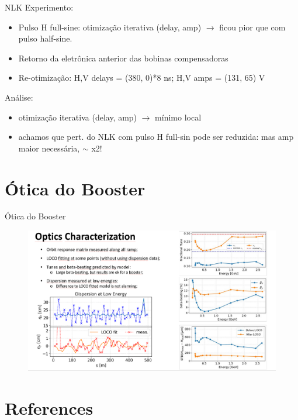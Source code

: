 \documentclass{beamer}					  %
\begin{document}
\begin{frame}{NLK}
    Experimento:
    \begin{itemize}
    		\item Pulso H full-sine: otimização iterativa (delay, amp) $\rightarrow$ ficou pior que com pulso half-sine.
            \item Retorno da eletrônica anterior das bobinas compensadoras
            \item Re-otimização: H,V delays = (380, 0)*8 ns; H,V amps = (131, 65) V
    \end{itemize}
    Análise:
    \begin{itemize}
            \item otimização iterativa (delay, amp) $\rightarrow$ mínimo local
            \item achamos que pert. do NLK com pulso H full-sin pode ser reduzida: {\color{red} mas amp maior necessária,  $\sim$ x2!}
    \end{itemize}
\end{frame}



\section{Ótica do Booster}

\begin{frame}{Ótica do Booster}
    \begin{figure}[H]
    		\centering
            \includegraphics[width=1.1\textwidth]{2024-02-16/figures/bo-optics.png}
            \label{fig:bo-optics}
    \end{figure}
\end{frame}



\section{References}
\end{document}
